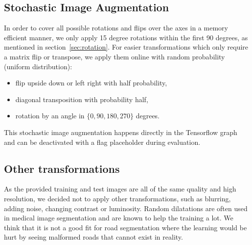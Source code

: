 \documentclass[10pt,conference,compsocconf]{IEEEtran}
\begin{document}
\subsection{Stochastic Image Augmentation}\label{sec:aug}
In order to cover all possible rotations and flips over the axes in a memory efficient manner, we only apply 15 degree rotations within the first 90 degrees, as mentioned in section~\ref{sec:rotation}. For easier transformations which only require a matrix flip or transpose, we apply them online with random probability (uniform distribution):

\begin{itemize}
  \item flip upside down or left right with half probability,
  \item diagonal transposition with probability half,
  \item rotation by an angle in $\{0,90,180,270\}$ degrees.
\end{itemize}

This stochastic image augmentation happens directly in the Tensorflow graph and can be deactivated with a
flag placeholder during evaluation.

\subsection{Other transformations}
As the provided training and test images are all of the same quality and high resolution, we decided not to apply other transformations, such as blurring, adding noise, changing contrast or luminosity. Random dilatations are often used in medical image segmentation and are known to help the training a lot. We think that it is not a good fit for road segmentation where the learning would be hurt by seeing malformed roads that cannot exist in reality.
\end{document}
